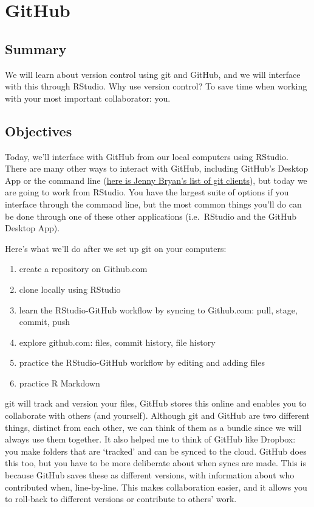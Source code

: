 \documentclass[]{book}
\providecommand{\tightlist}{%
  \setlength{\itemsep}{0pt}\setlength{\parskip}{0pt}}
\begin{document}
\hypertarget{github}{%
\chapter{GitHub}\label{github}}

\hypertarget{summary-1}{%
\section{Summary}\label{summary-1}}

We will learn about version control using git and GitHub, and we will interface with this through RStudio. Why use version control? To save time when working with your most important collaborator: you.

\hypertarget{objectives-1}{%
\section{Objectives}\label{objectives-1}}

Today, we'll interface with GitHub from our local computers using RStudio. There are many other ways to interact with GitHub, including GitHub's Desktop App or the command line (\href{http://stat545.com/git02_git-clients.html}{here is Jenny Bryan's list of git clients}), but today we are going to work from RStudio. You have the largest suite of options if you interface through the command line, but the most common things you'll do can be done through one of these other applications (i.e.~RStudio and the GitHub Desktop App).

Here's what we'll do after we set up git on your computers:

\begin{enumerate}
\def\labelenumi{\arabic{enumi}.}
\tightlist
\item
  create a repository on Github.com
\item
  clone locally using RStudio
\item
  learn the RStudio-GitHub workflow by syncing to Github.com: pull, stage, commit, push
\item
  explore github.com: files, commit history, file history
\item
  practice the RStudio-GitHub workflow by editing and adding files
\item
  practice R Markdown
\end{enumerate}

git will track and version your files, GitHub stores this online and enables you to collaborate with others (and yourself). Although git and GitHub are two different things, distinct from each other, we can think of them as a bundle since we will always use them together. It also helped me to think of GitHub like Dropbox: you make folders that are `tracked' and can be synced to the cloud. GitHub does this too, but you have to be more deliberate about when syncs are made. This is because GitHub saves these as different versions, with information about who contributed when, line-by-line. This makes collaboration easier, and it allows you to roll-back to different versions or contribute to others' work.
\end{document}

